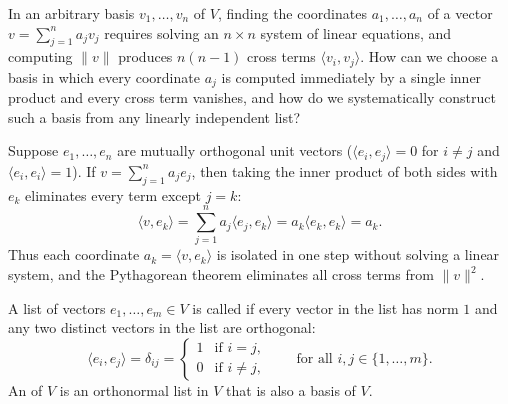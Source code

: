 \documentclass[10pt]{scrartcl}
\newcommand{\ip}[2]{\langle #1,#2\rangle}
\begin{document}
\begin{qbox}
  In an arbitrary basis $v_1,\dots,v_n$ of $V$, finding the coordinates $a_1,\dots,a_n$ of a vector $v=\sum_{j=1}^n a_jv_j$ requires solving an $n\times n$ system of linear equations, and computing $\|v\|$ produces $n(n-1)$ cross terms $\ip{v_i}{v_j}$. How can we choose a basis in which every coordinate $a_j$ is computed immediately by a single inner product and every cross term vanishes, and how do we systematically construct such a basis from any linearly independent list?
\end{qbox}

Suppose $e_1,\dots,e_n$ are mutually orthogonal unit vectors ($\ip{e_i}{e_j}=0$ for $i\ne j$ and $\ip{e_i}{e_i}=1$). If $v=\sum_{j=1}^n a_je_j$, then taking the inner product of both sides with $e_k$ eliminates every term except $j=k$:
\[
  \ip v{e_k} = \sum_{j=1}^n a_j\ip{e_j}{e_k} = a_k\ip{e_k}{e_k} = a_k.
\]
Thus each coordinate $a_k=\ip v{e_k}$ is isolated in one step without solving a linear system, and the Pythagorean theorem eliminates all cross terms from $\|v\|^2$.

\begin{definition*}
  A list of vectors $e_1,\dots,e_m\in V$ is called  if every vector in the list has norm $1$ and any two distinct vectors in the list are orthogonal:
  \[
    \ip{e_i}{e_j} = \delta_{ij} = \begin{cases} 1 & \text{if }i=j, \\ 0 & \text{if }i\ne j, \end{cases} \qquad\text{for all }i,j\in\{1,\dots,m\}.
  \]
  An  of $V$ is an orthonormal list in $V$ that is also a basis of $V$.
\end{definition*}
\end{document}
